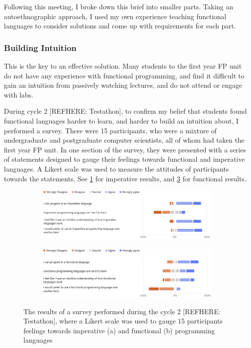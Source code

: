 Following this meeting, I broke down this brief into smaller parts. Taking an autoethnographic approach, I used my own experience teaching functional languages to consider solutions and come up with requirements for each part. 

\subsubsection{Building Intuition}
\label{building_intuition}
This is the key to an effective solution. Many students to the first year FP unit do not have any experience with functional programming, and find it difficult to gain an intuition from passively watching lectures, and do not attend or engage with labs. 

During cycle 2 [REFHERE: Testathon], to confirm my belief that students found functional languages harder to learn, and harder to build an intuition about, I performed a survey. There were 15 participants, who were a mixture of undergraduate and postgraduate computer scientists, all of whom had taken the first year FP unit. In one section of the survey, they were presented with a series of statements designed to gauge their feelings towards functional and imperative languages. A Likert scale\cite{likert1932technique} was used to measure the attitudes of participants towards the statements. See \ref{fig:imp_is_easy} for imperative results, and \ref{fig:fp_is_hard} for functional results. 

\begin{figure}[ht]
    \begin{subfigure}{\textwidth}
        \centering
        \includegraphics[width=\linewidth]{images/imperative_likert.png}
        \caption{}
        \label{fig:imp_is_easy}
    \end{subfigure}
    
    \begin{subfigure}{\textwidth}
        \centering
        \includegraphics[width=\linewidth]{images/fp_likert.png}
        \caption{}
        \label{fig:fp_is_hard}
    \end{subfigure}
    \caption{The results of a survey performed during the cycle 2 [REFHERE: Testathon], where a Likert scale was used to gauge 15 participants feelings towards imperative (a) and functional (b) programming languages}
\end{figure}
  

